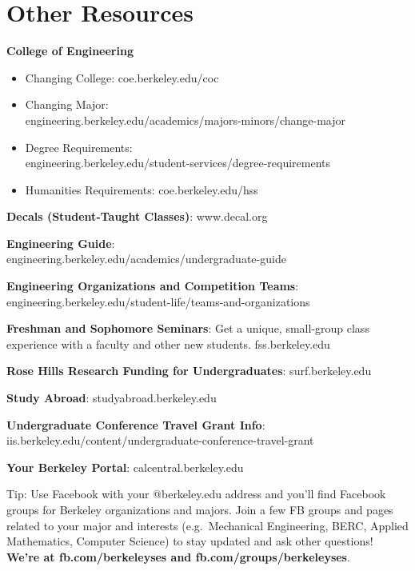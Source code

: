 \chapter*{Other Resources}

\textbf{College of Engineering}
\begin{itemize}
  \item Changing College: {\selectfont coe.berkeley.edu/coc}
  \item Changing Major: \\
    {\selectfont engineering.berkeley.edu/academics/majors-minors/change-major} 
  \item Degree Requirements: \\
    {\selectfont engineering.berkeley.edu/student-services/degree-requirements} 
  \item Humanities Requirements: {\selectfont coe.berkeley.edu/hss} 
\end{itemize}

\textbf{Decals (Student-Taught Classes)}: {\selectfont www.decal.org} 
    
\textbf{Engineering Guide}: \\
{\selectfont engineering.berkeley.edu/academics/undergraduate-guide}

\textbf{Engineering Organizations and Competition Teams}: \\
{\selectfont engineering.berkeley.edu/student-life/teams-and-organizations}

\textbf{Freshman and Sophomore Seminars}: Get a unique, small-group class experience with a faculty and other new students. {\selectfont fss.berkeley.edu}

\textbf{Rose Hills Research Funding for Undergraduates}:
{\selectfont surf.berkeley.edu}

\textbf{Study Abroad}: {\selectfont studyabroad.berkeley.edu} 

\textbf{Undergraduate Conference Travel Grant Info}: \\
{\selectfont iis.berkeley.edu/content/undergraduate-conference-travel-grant}

\textbf{Your Berkeley Portal}: {\selectfont calcentral.berkeley.edu} 

Tip: Use Facebook with your {\selectfont @berkeley.edu} address and you’ll find Facebook groups for Berkeley organizations and majors. Join a few FB groups and pages related to your major and interests (e.g.\ Mechanical Engineering, BERC, Applied Mathematics, Computer Science) to stay updated and ask other questions! \textbf{We’re at {\selectfont fb.com/berkeleyses} and {\selectfont fb.com/groups/berkeleyses}}.

